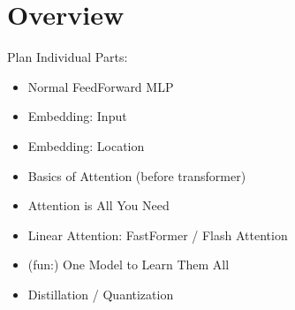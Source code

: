 \section{Overview}
\begin{frame}[c]{Plan}
    Individual Parts:
    \begin{itemize}[<+(1)->]
        \item Normal FeedForward MLP
        \item Embedding: Input
        \item Embedding: Location
        \item Basics of Attention (before transformer)
        \item Attention is All You Need \cite{vaswani_attention_2017}
        \item Linear Attention: FastFormer \cite{wu_fastformer_2021} / Flash Attention \cite{hua_transformer_2022}

        \item (fun:) One Model to Learn Them All \cite{kaiser_one_2017}
        \item Distillation / Quantization \cite{polino_model_2018}
    \end{itemize}
\end{frame}

